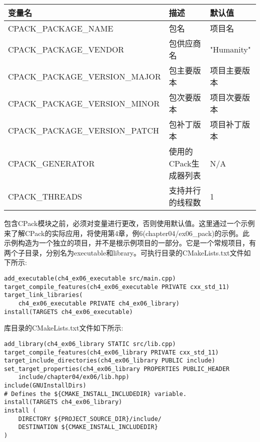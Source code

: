 \begin{table}[H]
	\centering
	\begin{tabular}{|l|l|l|}
		\hline
		\textbf{变量名}         & \textbf{描述}            & \textbf{默认值} \\ \hline
		CPACK\_PACKAGE\_NAME           & 包名                    & 项目名           \\ \hline
		CPACK\_PACKAGE\_VENDOR         & 包供应商名             & "Humanity"             \\ \hline
		CPACK\_PACKAGE\_VERSION\_MAJOR & 包主要版本           & 项目主要版本  \\ \hline
		CPACK\_PACKAGE\_VERSION\_MINOR & 包次要版本           & 项目次要版本  \\ \hline
		CPACK\_PACKAGE\_VERSION\_PATCH & 包补丁版本           & 项目补丁版本  \\ \hline
		CPACK\_GENERATOR               & 使用的CPack生成器列表 & N/A                    \\ \hline
		CPACK\_THREADS & 支持并行的线程数 & 1 \\ \hline
	\end{tabular}
\end{table}

包含CPack模块之前，必须对变量进行更改，否则使用默认值。这里通过一个示例来了解CPack的实际应用，将使用第4章，例6(chapter04/ex06\_pack)的示例。此示例构造为一个独立的项目，并不是根示例项目的一部分。它是一个常规项目，有两个子目录，分别名为executable和library。可执行目录的CMakeLists.txt文件如下所示:

\begin{lstlisting}[style=styleCMake]
add_executable(ch4_ex06_executable src/main.cpp)
target_compile_features(ch4_ex06_executable PRIVATE cxx_std_11)
target_link_libraries(
	ch4_ex06_executable PRIVATE ch4_ex06_library)
install(TARGETS ch4_ex06_executable)
\end{lstlisting}

库目录的CMakeLists.txt文件如下所示:

\begin{lstlisting}[style=styleCMake]
add_library(ch4_ex06_library STATIC src/lib.cpp)
target_compile_features(ch4_ex06_library PRIVATE cxx_std_11)
target_include_directories(ch4_ex06_library PUBLIC include)
set_target_properties(ch4_ex06_library PROPERTIES PUBLIC_HEADER
	include/chapter04/ex06/lib.hpp)
include(GNUInstallDirs)
# Defines the ${CMAKE_INSTALL_INCLUDEDIR} variable.
install(TARGETS ch4_ex06_library)
install (
	DIRECTORY ${PROJECT_SOURCE_DIR}/include/
	DESTINATION ${CMAKE_INSTALL_INCLUDEDIR}
)
\end{lstlisting}

